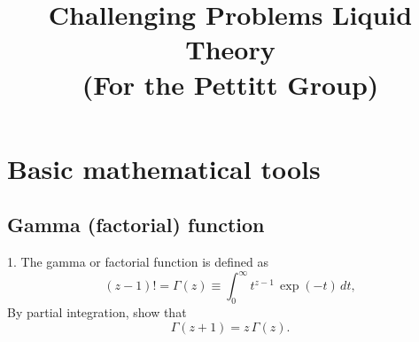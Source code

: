 \documentclass{book}
\begin{document}
\newcommand{\problem}[1]{\section{#1}}
\newcommand{\hint}[1]{[\,\emph{Hint.} #1]}

\newcommand{\vct}[1]{\boldsymbol{\mathbf{#1}}}
\newcommand{\vr}{\vct{r}}
\newcommand{\vrN}{\vr^N}
\newcommand{\vrn}{\vr^n}
\newcommand{\dvr}{\frac{ d \vr  }{(2\pi)^3}}
\newcommand{\vx}{\vct{x}}
\newcommand{\vxN}{\vx^N}
\newcommand{\vxn}{\vx^n}
\newcommand{\dvx}{\frac{ d \vx  }{(2\pi)^3}}
\newcommand{\vk}{\vct{k}}
\newcommand{\dvk}{\frac{ d \vk  }{(2\pi)^3}}
\newcommand{\FT}[1]{\tilde{#1}}
\newcommand{\FTc}{\FT{c}}
\newcommand{\FTh}{\FT{h}}

\newcommand{\supex}[1]{ { { #1 }^{ \mathrm{ex} } } }
\newcommand{\Pex}{\supex{P}}
\newcommand{\Fex}{\supex{F}}
\newcommand{\muex}{\supex{\mu}}
\newcommand{\kex}{\supex{\kappa}}
\newcommand{\Chn}{\mathscr{C}}
\newcommand{\secref}[1]{Sec. \ref{#1}}

\newcommand{\llbra}{[\![}
\newcommand{\llket}{]\!]}

\newcommand{\plam}{\partial_\lambda}
\newcommand{\pbet}{\partial_\beta}



\title{Challenging Problems Liquid Theory \\
  (For the Pettitt Group)}
\date{}
\maketitle

\tableofcontents





\chapter{Basic mathematical tools}



\problem{Gamma (factorial) function}



1. The gamma or factorial function is defined as
\begin{equation}
  (z - 1)! = \Gamma(z)
\equiv
  \int_0^\infty t^{z-1} \, \exp(-t) \, d t,
  \label{eq:gammaDef}
\end{equation}
%
By partial integration, show that
\begin{equation}
  \Gamma(z + 1) = z \, \Gamma(z).
  \label{eq:gammaRecur}
\end{equation}
\end{document}

